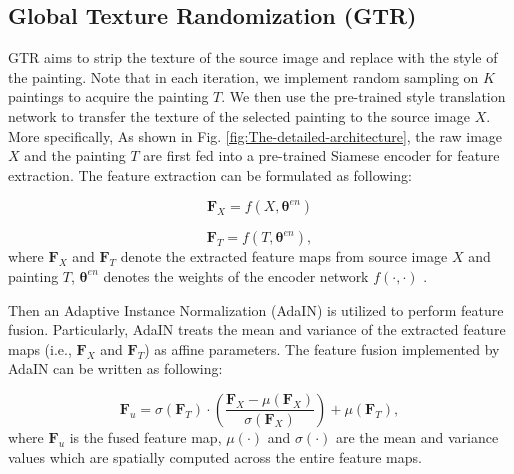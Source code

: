 \documentclass[twocolumn,journal,vlined,ruled,linesnumbered]{IEEEtran}
\begin{document}
\subsection{Global Texture Randomization (GTR)}

GTR aims to strip the texture of the source image and replace with the style of the painting. Note that in each iteration, we implement random sampling on $K$ paintings to acquire the painting $T$. We then use the pre-trained style translation network \cite{huang2017arbitrary} to transfer the texture of the selected painting to the source image $X$. More specifically, As shown in Fig. \ref{fig:The-detailed-architecture}, the raw image $X$ and the painting $T$ are first fed into a pre-trained Siamese encoder for feature extraction. The feature extraction can be formulated as following:\vspace{-2mm}

\begin{equation}
\mathbf{F_{\mathrm{\mathit{X}}}}=f(X,\boldsymbol{\theta}^{en})
\end{equation}

\vspace{-2mm}

\begin{equation}
\mathbf{F_{\mathrm{\mathit{T}}}}=f(T,\boldsymbol{\theta}^{en}),
\end{equation}
where $\mathbf{F}_{X}$ and $\mathbf{F}_{T}$ denote the extracted feature maps from source image $X$ and painting $T$, $\boldsymbol{\theta}^{en}$ denotes the weights of the encoder network $f(\cdot,\cdot)$ .

Then an Adaptive Instance Normalization (AdaIN) \cite{huang2017arbitrary} is utilized to perform feature fusion. Particularly, AdaIN treats the mean and variance of the extracted feature maps (i.e., $\mathbf{F}_{X}$ and $\mathbf{F}_{T}$) as affine parameters. The feature fusion implemented by AdaIN can be written as following:

\begin{equation}
\mathbf{F_{\mathit{u}}}=\sigma(\mathbf{F_{\mathrm{\mathit{T}}}})\cdot(\frac{\mathbf{F_{\mathrm{\mathit{X}}}}-\mu(\mathbf{F_{\mathrm{\mathit{X}}}})}{\sigma(\mathbf{F_{\mathrm{\mathit{X}}}})})+\mu(\mathbf{F_{\mathrm{\mathit{T}}}}),
\end{equation}
where $\mathbf{F_{\mathit{u}}}$ is the fused feature map, $\mu(\cdot)$ and $\sigma(\cdot)$ are the mean and variance values which are spatially computed across the entire feature maps.
\end{document}
